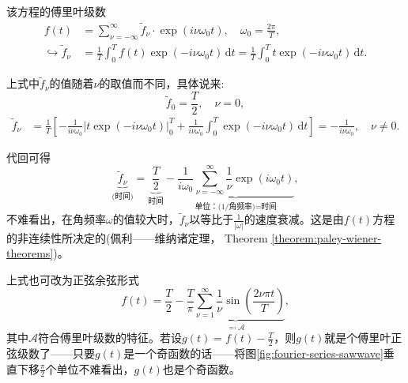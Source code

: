 该方程的傅里叶级数
\begin{equation*}
  \begin{split}
    f(t) & = \sum_{\nu = - \infty}^{\infty} \tilde{f}_{\nu} \cdot \exp \left( i \nu \omega_{0} t \right), \quad \omega_{0} = \frac{2 \pi}{T}, \\
    \hookrightarrow \tilde{f}_{\nu} & = \frac{1}{T} \int_{0}^{T} f(t) \exp \left( - i \nu \omega_{0} t \right) \, \mathrm{d} t = \frac{1}{T} \int_{0}^{T} t \exp \left( - i \nu \omega_{0} t  \right) \, \mathrm{d} t.
  \end{split}
\end{equation*}

上式中$\tilde{f}_{\nu}$的值随着$\nu$的取值而不同，具体说来:
\begin{equation*}
  \tilde{f}_{0} = \frac{T}{2}, \quad \nu = 0,
\end{equation*}
\begin{equation*}
  \begin{split}
    \tilde{f}_{\nu} & = \frac{1}{T}
    \left[
    - \frac{1}{ i \nu \omega_{0}}
    \left| t \exp \left( - i \nu \omega_{0} t \right) \right|_{0}^{T}
    + \frac{1}{ i \nu \omega_{0}}
    \int_{0}^{T} \exp \left( - i \nu \omega_{0} t \right) \, \mathrm{d} t
    \right]  = - \frac{1}{i \nu \omega_{0}}, \quad \nu \neq 0.
  \end{split}
\end{equation*}

代回可得
\begin{equation*}
    \underbrace{
    \tilde{f}_{\nu}
    }_{\text{(时间)}} =
    \underbrace{
    \frac{T}{2}
    }_{\text{时间}}
     - \underbrace{
     \frac{1}{i \omega_{0}} \sum_{\nu = - \infty}^{\infty} \frac{1}{\nu} \exp \left( i \omega_{0} t \right)
     }_{\text{单位：(1/角频率)=时间}},
\end{equation*}
不难看出，在角频率$\omega$的值较大时，$\tilde{f}_{\nu}$以等比于$\frac{1}{\left| \omega \right|}$的速度衰减。这是由$f(t)$方程的非连续性所决定的(佩利——维纳诸定理， Theorem \ref{theorem:paley-wiener-theorems})。

上式也可改为正弦余弦形式
\begin{equation}
  \label{eq:fourier-series-sin-coef-sincos}
  f(t) = \frac{T}{2} - \underbrace{
  \frac{T}{\pi} \sum_{\nu = 1}^{\infty} \frac{1}{\nu}
  \sin \left(
  \frac{2 \nu \pi t}{T}
  \right)
  }_{\eqqcolon \mathcal{A}},
\end{equation}
其中$\mathcal{A}$符合傅里叶级数的特征。若设$g(t) = f(t) - \frac{T}{2}$，则$g(t)$就是个傅里叶正弦级数了——只要$g(t)$是一个奇函数的话——将图\ref{fig:fourier-series-sawwave}垂直下移$\frac{\pi}{2}$个单位不难看出，$g(t)$也是个奇函数。

